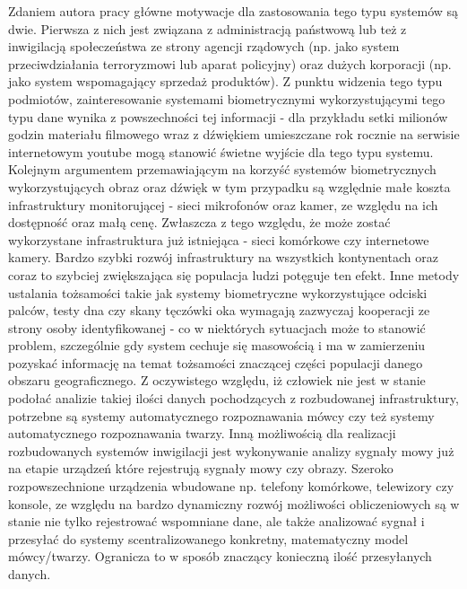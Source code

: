 Zdaniem autora pracy główne motywacje dla zastosowania tego typu systemów są dwie. Pierwsza z nich jest związana z administracją państwową lub też z inwigilacją społeczeństwa ze strony agencji rządowych (np. jako system przeciwdziałania terroryzmowi lub aparat policyjny) oraz dużych korporacji (np. jako system wspomagający sprzedaż produktów). Z punktu widzenia tego typu podmiotów, zainteresowanie systemami biometrycznymi wykorzystującymi tego typu dane wynika z powszechności tej informacji - dla przykładu setki milionów godzin materiału filmowego wraz z dźwiękiem umieszczane rok rocznie na serwisie internetowym youtube\cite{ystats} mogą stanowić świetne wyjście dla tego typu systemu. Kolejnym argumentem przemawiającym na korzyść systemów biometrycznych wykorzystujących obraz oraz dźwięk w tym przypadku są względnie małe koszta infrastruktury monitorującej - sieci mikrofonów oraz kamer, ze względu na ich dostępność oraz małą cenę. Zwłaszcza z tego względu, że może zostać wykorzystane infrastruktura już istniejąca - sieci komórkowe czy internetowe kamery. Bardzo szybki rozwój infrastruktury na wszystkich kontynentach oraz coraz to szybciej zwiększająca się populacja ludzi potęguje ten efekt. Inne metody ustalania tożsamości takie jak systemy biometryczne wykorzystujące odciski palców, testy dna czy skany tęczówki oka wymagają zazwyczaj kooperacji ze strony osoby identyfikowanej - co w niektórych sytuacjach może to stanowić problem, szczególnie gdy system cechuje się masowością i ma w zamierzeniu pozyskać informację na temat tożsamości znaczącej części populacji danego obszaru geograficznego. Z oczywistego względu, iż człowiek nie jest w stanie podołać analizie takiej ilości danych pochodzących z rozbudowanej infrastruktury, potrzebne są systemy automatycznego rozpoznawania mówcy czy też systemy automatycznego rozpoznawania twarzy.
Inną możliwością dla realizacji rozbudowanych systemów inwigilacji jest wykonywanie analizy sygnały mowy już na etapie urządzeń które rejestrują sygnały mowy czy obrazy. Szeroko rozpowszechnione urządzenia wbudowane np. telefony komórkowe, telewizory czy konsole, ze względu na bardzo dynamiczny rozwój możliwości obliczeniowych są w stanie nie tylko rejestrować wspomniane dane, ale także analizować sygnał i przesyłać do systemy scentralizowanego konkretny, matematyczny model mówcy/twarzy. Ogranicza to w sposób znaczący konieczną ilość przesyłanych danych.

